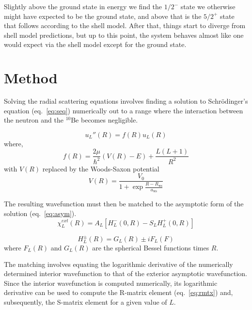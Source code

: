 \documentclass[]{scrartcl}
\begin{document}

Slightly above the ground state in energy we find the $1/2^-$ state we otherwise might have expected to be the ground state, and above that is the $5/2^+$ state that follows according to the shell model. After that, things start to diverge from shell model predictions, but up to this point, the system behaves almost like one would expect via the shell model except for the ground state.

\section*{Method}\nonumber

Solving the radial scattering equations involves finding a solution to Schr\"{o}dinger's equation (eq.~\ref{eq:seq}) numerically out to a range where the interaction between the neutron and the $^{10}$Be becomes negligible.

\begin{equation}
	u_{L} '' (R) = f(R) u_{L} (R)
	\label{eq:seq}
\end{equation}
where,
\begin{equation}
	f(R) = \frac{2 \mu}{\hbar ^2} (V(R) - E) + \frac{L(L+1)}{R^2}
\end{equation}
with $V(R)$ replaced by the Woods-Saxon potential
\begin{equation}
	V(R) = \frac{ V_0 }{ 1 + \exp{ \frac{ R - R_{\mathrm{ws}} }{a_{\mathrm{ws}}}}}
	\label{eq:ws}
\end{equation}

\noindent The resulting wavefunction must then be matched to the asymptotic form of the solution (eq.~\ref{eq:asym}).
\begin{equation}
	\chi _L ^{ext} (R) = A _L [ H _L ^- (0,R) - S_L H_L ^+ (0,R) ]
	\label{eq:asym}
\end{equation}

\begin{equation}
	H_L ^{\pm} (R) = G_L (R) \pm i F_L (F)
\end{equation}
where $F_L (R)$ and $G_L (R)$ are the spherical Bessel functions times $R$.

The matching involves equating the logarithmic derivative of the numerically determined interior wavefunction to that of the exterior asymptotic wavefunction. Since the interior wavefunction is computed numerically, its logarithmic derivative can be used to compute the R-matrix element (eq.~\ref{eq:rmtx}) and, subsequently, the S-matrix element for a given value of $L$.
\end{document}
